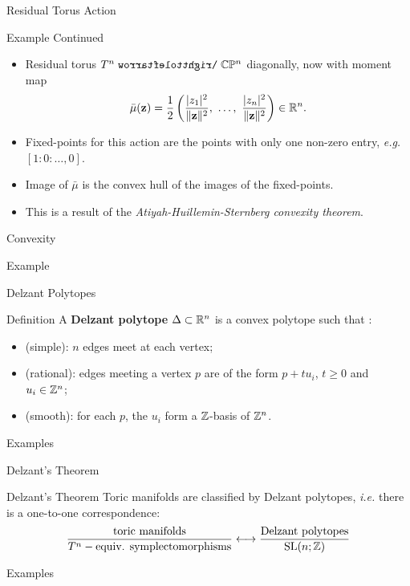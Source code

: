 \begin{frame}{Residual Torus Action}
    \begin{block}{Example Continued}
        \begin{itemize}
        \item Residual torus $T^{n} \acts \CC\PP^{n}$ diagonally, now with moment map
        $$ \bar{\mu}(\vb{z}) = \frac{1}{2} \left( \frac{|z_{1}|^{2}}{\| \vb{z} \|^{2} },\ \ldots,\ \frac{|z_{n}|^{2}}{\| \vb{z} \|^{2} } \right) \in \mathbb{R}^{n}. $$ 
        \item Fixed-points for this action are the points with only one non-zero entry, \emph{e.g.} $[1:0:\ldots, 0]$.
        \item Image of $\bar{\mu}$ is the convex hull of the images of the fixed-points.
        \item This is a result of the \emph{Atiyah-Huillemin-Sternberg convexity theorem}.
        \end{itemize}
    \end{block}
\end{frame}

\begin{frame}{Convexity}
    \begin{block}{Example}
        \vspace{192pt}
    \end{block}
\end{frame}

\begin{frame}{Delzant Polytopes}
    \begin{block}{Definition}
        A \textbf{Delzant polytope} $\Delta \subset \mathbb{R}^{n}$ is a convex polytope such that \cite{delzant1988}:
        \begin{itemize}
            \item (simple): $n$ edges meet at each vertex;
            \item (rational): edges meeting a vertex $p$ are of the form $p + tu_{i}$, $t \geq 0$ and $u_{i} \in \mathbb{Z}^{n}$;
            \item (smooth): for each $p$, the $u_{i}$ form a $\mathbb{Z}$-basis of $\mathbb{Z}^{n}$.
        \end{itemize}
    \end{block}
    \begin{block}{Examples}
        \vspace{64pt}
    \end{block}
\end{frame}

\begin{frame}{Delzant's Theorem}
    \begin{block}{Delzant's Theorem \cite{delzant1988}}
        Toric manifolds are classified by Delzant polytopes, \emph{i.e.} there is a one-to-one correspondence:
        $$ \frac{\text{toric manifolds}}{T^{n}-\text{equiv. symplectomorphisms}} \longleftrightarrow \frac{ \text{Delzant polytopes} }{ \operatorname{SL}(n;\mathbb{Z}) } $$ 
    \end{block}
    \begin{block}{Examples}
        \vspace{68pt}
    \end{block}
\end{frame}

